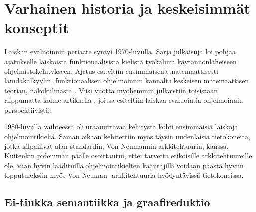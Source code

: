 
\section{Varhainen historia ja keskeisimmät konseptit}\label{historia}

Laiskan evaluoinnin periaate syntyi 1970-luvulla. Sarja julkaisuja loi pohjaa ajatukselle laiskoista funktionaalisista kielistä työkaluna käytännönläheiseen ohjelmistokehitykseen. Ajatus esiteltiin ensimmäisenä matemaattisesti lamdakalkyylin, funktionaalisen ohjelmoinnin kannalta keskeisen matemaattisen teorian, näkökulmasta \citep{wadsworth1971semantics}. Viisi vuotta myöhemmin julkaistiin toisistaan riippumatta kolme artikkelia \citep{henderson1976lazy,friedman1976cuns,saslmanualturner}, joissa esiteltiin laiskaa evaluointia ohjelmoinnin perspektiivistä.

1980-luvulla vaihteessa oli uraauurtavaa kehitystä kohti ensimmäisiä laiskoja ohjelmointikieliä. Saman aikaan kehitettiin myös täysin uudenlaisia tietokoneita, jotka kilpailivat alan standardin, Von Neumannin arkkitehtuurin, kanssa. Kuitenkin pidemmän päälle osoittautui, ettei tarvetta erikoisille arkkitehtuureille ole, vaan hyvin laadituilla ohjelmointikielten kääntäjillä voidaan päästä hyviin lopputuloksiin myös Von Neuman -arkkitehtuuria hyödyntävissä tietokoneissa. \citep{hudak2007history}

\subsection{Ei-tiukka semantiikka ja graafireduktio}

